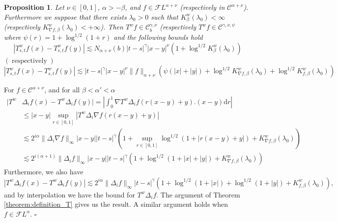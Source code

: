 \documentclass[a4paper,11pt]{article}
\newcommand{\mathd}{\mathrm{d}}
\newcommand{\tmop}[1]{\ensuremath{\operatorname{#1}}}
\newtheorem{proposition}[theorem]{Proposition}
\newenvironment{proof}{{\sc Proof.}}{\hfill$\square$}
\newcommand{\CC}{\mathscr C}
\newcommand{\CF}{\mathscr F}
\begin{document}
\begin{proposition}
  \label{prop:holder_continuity_of_averaging_path}Let $\nu \in [ 0,1 ]$,
  $\alpha >- \beta$, and $f \in \CF L^{\alpha + \nu}$ (respectively in
  $\CC^{\alpha + \nu}$). Furthermore we suppose that there exists $\lambda_{0}
  >0$ such that $K^{w}_{\beta} ( \lambda_{0} ) < \infty$ (respectively
  $K^{w}_{\nabla f, \beta} ( \lambda_{0} ) <+ \infty$). Then $T^{w} f \in
  \CC^{\gamma , \nu}_{b}$ (respectively $T^{w} f \in \CC^{\gamma , \nu ,
  \psi}$ where $\psi ( r ) =1+ \log^{1/2} ( 1+r )$ and the following bounds
  hold
  \[ | T^{w}_{s,t} f ( x ) -T^{w}_{s,t} f ( y ) | \lesssim N_{\alpha + \nu} (
     b ) | t-s |^{\gamma} | x-y |^{\nu} ( 1+ \log^{1/2} K^{w}_{\beta} (
     \lambda_{0} ) ) \]
  $( \tmop{respectively} )  $
  \[ | T^{w}_{s,t} f ( x ) -T^{w}_{s,t} f ( y ) | \lesssim | t-s |^{\gamma} |
     x-y |^{\nu} \| f \|_{\alpha + \nu} ( \psi ( | x | + | y | ) + \log^{1/2}
     K^{w}_{\nabla f, \beta} ( \lambda_{0} ) + \log^{1/2} K^{w}_{f, \beta} (
     \lambda_{0} ) ) \]
\end{proposition}

\begin{proof}
  For $f \in \CC^{\alpha + \nu}$, and for all $\beta < \alpha' < \alpha$
  \begin{equation*}
  \begin{split}
    | T^{w} & \Delta_{i} f ( x ) -T^{w} \Delta_{i} f ( y ) |  =  \left\lvert
    \int_{0}^{1} \nabla T^{w} \Delta_{i} f ( r  ( x-y ) +y ) . ( x-y ) \mathd
    r \right\lvert\\
    & \leqslant  | x-y | \sup_{r \in [ 0,1 ]} | T^{w} \Delta_{i} \nabla f (
    r  ( x-y ) +y ) |\\
    & \lesssim  2^{i \alpha} \| \Delta_{i} \nabla f \|_{\infty} | x-y | |
    t-s |^{\gamma} ( 1+ \sup_{r \in [ 0,1 ]} \log^{1/2} ( 1+ | r  ( x-y ) +y |
    ) +K^{w}_{\nabla f, \beta} ( \lambda_{0} ) )\\
    & \lesssim   2^{i ( \alpha +1 )} \| \Delta_{i} f \|_{\infty} | x-y | |
    t-s |^{\gamma} ( 1+ \log^{1/2} ( 1+ | x | + | y | ) +K^{w}_{\nabla f,
    \beta} ( \lambda_{0} ) )
    \end{split}
  \end{equation*}
  Furthermore, we also have
  \[ | T^{w} \Delta_{i} f ( x ) -T^{w} \Delta_{i} f ( y ) | \lesssim 2^{i
     \alpha} \| \Delta_{i} f \|_{\infty} | t-s |^{\gamma} ( 1+ \log^{1/2} ( 1+
     | x | ) + \log^{1/2} ( 1+ | y | ) +K^{w}_{f, \beta} ( \lambda_{0} ) ) ,
  \]
  and by interpolation we have the bound for $T^{w} \Delta_{i} f$. The
  argument of Theorem \ref{theorem:definition_T} gives us the result. A
  similar argument holds when $f \in \CF L^{\alpha}$.
\end{proof}
\end{document}
